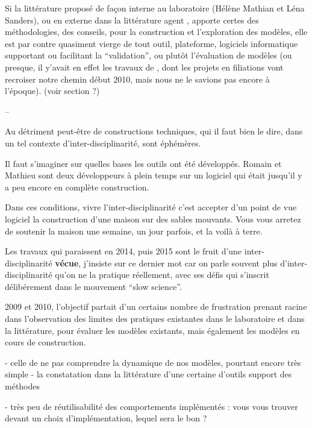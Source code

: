 Si la littérature proposé de façon interne au laboratoire (Hélène Mathian et Léna Sanders), ou en externe dans la littérature agent \autocites{Amblard2006,Sargent2010, Gilbert2008}, apporte certes des méthodologies, des conseils, pour la construction et l'exploration des modèles, elle est par contre quasiment vierge de tout outil, plateforme, logiciels informatique supportant ou facilitant la \enquote{validation}, ou plutôt l'évaluation de modèles \autocite{Amblard2006}  (ou presque, il y'avait en effet les travaux de \textcite{Amblard2003}, dont les projets en filiations vont recroiser notre chemin début 2010, mais nous ne le savions pas encore à l'époque). (voir section ?)



--

Au détriment peut-être de constructions techniques, qui il faut bien le dire, dans un tel contexte d'inter-disciplinarité, sont éphémères.

Il faut s'imaginer sur quelles bases les outils ont été développés. Romain et Mathieu sont deux développeurs à plein temps sur un logiciel qui était jusqu'il y a peu encore en complète construction.

Dans ces conditions, vivre l'inter-disciplinarité c'est accepter d'un point de vue logiciel la construction d'une maison sur des sables mouvants. Vous vous arretez de soutenir la maison une semaine, un jour parfois, et la voilà à terre.

Les travaux qui paraissent en 2014, puis 2015 sont le fruit d'une inter-disciplinarité \textbf{vécue}, j'insiste sur ce dernier mot car on parle souvent plus d'inter-disciplinarité qu'on ne la pratique réellement, avec ses défis \autocite{Chapron2014} qui s'inscrit délibérement dans le mouvement \enquote{slow science}.






 2009 et 2010, l'objectif partait d'un certains nombre de frustration prenant racine  dans l'observation des limites des pratiques existantes dans le laboratoire et dans la littérature, pour évaluer les modèles existants, mais également les modèles en cours de construction.

  - celle de ne pas comprendre la dynamique de nos modèles, pourtant encore très simple
  - la constatation dans la littérature d'une certaine d'outils support des méthodes

  - très peu de réutilisabilité des comportements implémentés : vous vous trouver devant un choix d'implémentation, lequel sera le bon ?


